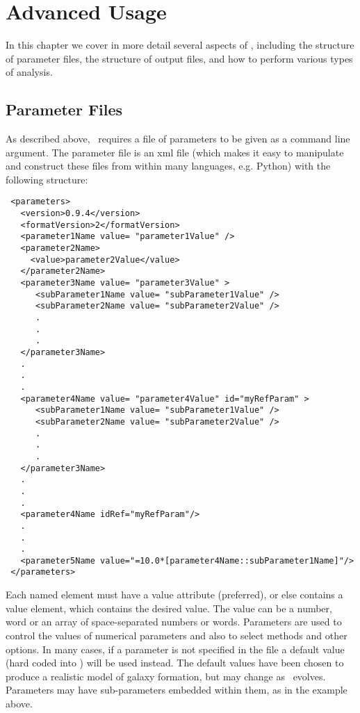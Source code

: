 \chapter{Advanced Usage}

In this chapter we cover in more detail several aspects of \glc, including the structure of parameter files, the structure of output files, and how to perform various types of analysis.

\section{Parameter Files}\label{sec:ParameterFiles}

As described above, \glc\ requires a file of parameters to be given as a command line argument. The parameter file is an \gls{xml} file (which makes it easy to manipulate and construct these files from within many languages, e.g. Python) with the following structure:
\begin{verbatim}
 <parameters>
   <version>0.9.4</version>
   <formatVersion>2</formatVersion>
   <parameter1Name value= "parameter1Value" />
   <parameter2Name>
     <value>parameter2Value</value>
   </parameter2Name>
   <parameter3Name value= "parameter3Value" >
      <subParameter1Name value= "subParameter1Value" />
      <subParameter2Name value= "subParameter2Value" />
      .
      .
      .
   </parameter3Name>
   .
   .
   .
   <parameter4Name value= "parameter4Value" id="myRefParam" >
      <subParameter1Name value= "subParameter1Value" />
      <subParameter2Name value= "subParameter2Value" />
      .
      .
      .
   </parameter3Name>
   .
   .
   .
   <parameter4Name idRef="myRefParam"/>
   .
   .
   .
   <parameter5Name value="=10.0*[parameter4Name::subParameter1Name]"/>
 </parameters>
\end{verbatim}
Each named element must have a {\normalfont \ttfamily value} attribute (preferred), or else contains a value element, which contains the desired value. The value can be a number, word or an array of space-separated numbers or words. Parameters are used to control the values of numerical parameters and also to select methods and other options. In many cases, if a parameter is not specified in the file a default value (hard coded into \glc) will be used instead. The default values have been chosen to produce a realistic model of galaxy formation, but may change as \glc\ evolves. Parameters may have sub-parameters embedded within them, as in the example above.

